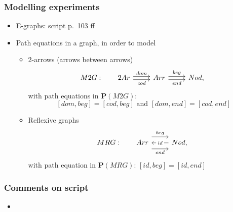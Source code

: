 \documentclass[handout]{beamer}
\newcommand{\bfsf}[1]{{\boldsymbol{#1}}}
\newcommand{\PP}{\bfsf{P}}
\begin{document}
\frame
  {   
    \frametitle{Modelling experiments}\label{Ch3:Modelling}

 \begin{itemize}[<+->]
\item E-graphs: script p.\ 103 ff
\item Path equations in a graph, in order to model
   \begin{itemize}[<+->]
\item 2-arrows (arrows between arrows)
\[M2G:~~~~~ 
\begin{tikzcd}[ampersand replacement=\&]
2Ar \arrow[yshift=0.5ex]{r}{dom} \arrow[swap, yshift=-0.5ex]{r}{cod} \& Arr \arrow[yshift=0.5ex]{r}{beg} \arrow[swap, yshift=-0.5ex]{r}{end} \& Nod,
\end{tikzcd}\]
with path equations in $\PP(M2G)$:
\[
[dom,beg]=[cod,beg] \text{~and~} [dom,end]=[cod,end]
\] 
\item Reflexive graphs
 \[MRG:~~~~~
\begin{tikzcd}[ampersand replacement=\&]
Arr \arrow[yshift=2ex]{r}{beg} \arrow[swap, yshift=-2ex]{r}{end}  \& \arrow{l}[description]{id} Nod,
\end{tikzcd}\] 
with path equation in $\PP(MRG)$: $[id,beg]=[id,end]$ 
   \end{itemize}

 \end{itemize}

 }

\frame
  {   
    \frametitle{Comments on script}\label{Ch3:comments}

 \begin{itemize}[<+->]
\item 
 \end{itemize}

 }
\end{document}
